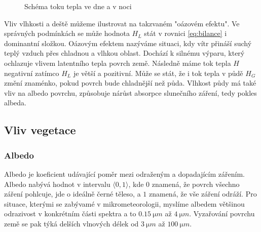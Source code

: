 \begin{figure}
\centering
\caption{Schéma toku tepla ve dne a v noci}
\label{fig:schema}
\end{figure}

Vliv vlhkosti a deště můžeme ilustrovat na takzvaném "oázovém efektu". Ve správných podmínkách se může hodnota $H_L$ stát v rovnici \eqref{eq:bilance} i dominantní složkou. Oázovým efektem nazýváme situaci, kdy vítr přináší suchý teplý vzduch přes chladnou a vlhkou oblast. Dochází k silnému výparu, který ochlazuje vlivem latentního tepla povrch země. Následně máme tok tepla $H$ negativní zatímco $H_L$ je větší a pozitivní. Může se stát, že i tok tepla v půdě $H_G$ změní znaménko, pokud povrch bude chladnější než půda. Vlhkost půdy má také vliv na albedo povrchu, způsobuje nárůst absorpce slunečního záření, tedy pokles albeda\cite{arya2001}.

\subsection{Vliv vegetace} \label{chap:veg}
\subsubsection{Albedo}
Albedo je koeficient udávající poměr mezi odraženým a dopadajícím zářením. Albedo nabývá hodnot v intervalu $\langle 0,1\rangle$, kde $0$ znamená, že povrch všechno záření pohlcuje, jde o ideálně černé těleso, a $1$ znamená, že vše záření odráží. Pro situace, kterými se zabývamé v mikrometeorologii, myslíme albedem většinou odrazivost v konkrétním části spektra a to $\SI{0.15}{\micro m}$ až $\SI{4}{\micro m}$. Vyzařování povrchu země se pak týká delších vlnových délek od $\SI{3}{\micro m}$ až $\SI{100}{\micro m}$. 

